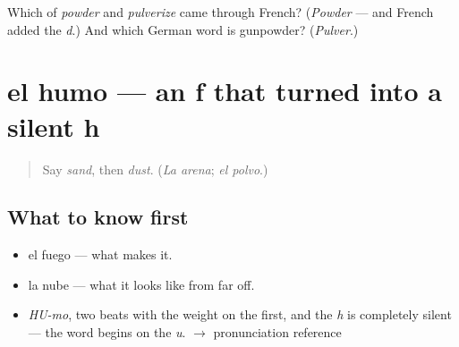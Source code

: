 \begin{tcolorbox}[breakable,colback=teal!4,colframe=teal!35!black,title={Before you move on}]
Which of \emph{powder} and \emph{pulverize} came through French? (\emph{Powder} — and French added the \emph{d}.) And which German word is gunpowder? (\emph{Pulver}.)
\end{tcolorbox}
\section[el humo]{el humo — an f that turned into a silent h}

\label{lesson:ES-C369-humo}



\begin{quote}
Say \emph{sand}, then \emph{dust}. (\emph{La arena}; \emph{el polvo}.)
\end{quote}

\subsection*{What to know first}
\begin{itemize}
\raggedright
  \item el fuego — what makes it.
  \item la nube — what it looks like from far off.
\end{itemize}

\begin{sounds}
\begin{itemize}
\raggedright
  \item \emph{HU-mo}, two beats with the weight on the first, and the \emph{h} is completely silent — the word begins on the \emph{u}. $\to$ pronunciation reference
\end{itemize}
\end{sounds}

